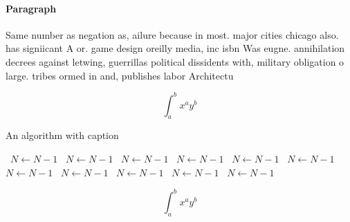 \documentclass[a4paper]{article}
\begin{document}
\paragraph{Paragraph}
Same number as negation as, ailure because in most. major cities chicago also. has signiicant A or. game design oreilly media, inc isbn Was eugne. annihilation decrees against letwing, guerrillas political dissidents with, military obligation o large. tribes ormed in and, publishes labor Architectu


\[ \int_{a}^{b}{x^{a}y^{b}} \]

\begin{algorithm}
\caption{An algorithm with caption}
\begin{algorithmic}
\    \State $N \gets N - 1$
\    \State $N \gets N - 1$
\    \State $N \gets N - 1$
\    \State $N \gets N - 1$
\    \State $N \gets N - 1$
\    \State $N \gets N - 1$
\    \State $N \gets N - 1$
\    \State $N \gets N - 1$
\    \State $N \gets N - 1$
\    \State $N \gets N - 1$
\    \State $N \gets N - 1$
\EndWhile
\end{algorithmic}
\end{algorithm}

\[ \int_{a}^{b}{x^{a}y^{b}} \]
\end{document}

